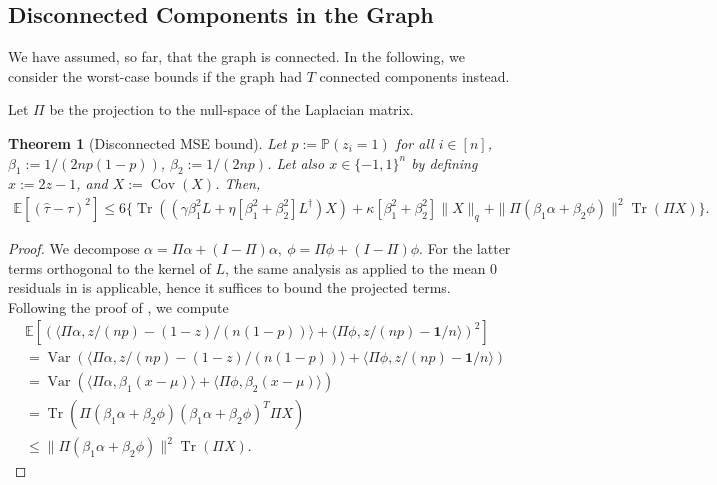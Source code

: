 \documentclass[12pt]{article}
\newtheorem{theorem}{Theorem}
\theoremstyle{definition}
\numberwithin{equation}{section}
\numberwithin{figure}{section}
\numberwithin{equation}{section}
\numberwithin{figure}{section}
\begin{document}
\subsection{Disconnected Components in the Graph}\label{sec:graph comps}
We have assumed, so far, that the graph is connected. In the following, we consider the worst-case bounds if the graph had $T$ connected components instead.

Let $\Pi$ be the projection to the null-space of the Laplacian matrix. 

\begin{theorem}[Disconnected MSE bound] \label{thm:mse_bound_general_projection}
Let $p:= \mathbb{P}(z_i = 1)$ for all $i \in [n]$, $\beta_1 := 1/(2np(1-p))$, $\beta_2 := 1/(2np)$. Let also $x \in \{-1, 1\}^n$ by defining $x := 2z-1$, and $X:= \operatorname{Cov}(X)$. Then, 
     \begin{align*}
          \mathbb{E}[(\hat{\tau} -\tau)^2] \leq 6 \{ \operatorname{Tr}((\gamma \beta_1^2 L + \eta[\beta_1^2 + \beta_2^2] L^\dagger) X) + \kappa[\beta_1^2 + \beta_2^2] \|X\|_{q} + \|\Pi(\beta_1 \alpha + \beta_2 \phi)\|^2 \operatorname{Tr}(\Pi X)\}.
     \end{align*}
\end{theorem}

\begin{proof}
    We decompose $\alpha = \Pi \alpha + (I - \Pi)\alpha,\ \phi = \Pi \phi + (I - \Pi) \phi$. For the latter terms orthogonal to the kernel of $L$, the same analysis as applied to the mean 0 residuals in  is applicable, hence it suffices to bound the projected terms.
    Following the proof of , we compute
    \begin{align*}
         &\mathbb{E}[(\langle \Pi \alpha, z/(np) - (1-z)/(n(1-p))  \rangle + \langle \Pi \phi, z/(np) - \mathbf{1}/n \rangle)^2] \\
         &= \operatorname{Var}(\langle \Pi \alpha, z/(np) - (1-z)/(n(1-p))\rangle + \langle \Pi \phi, z/(np) - \mathbf{1}/n \rangle )\\
         &= \operatorname{Var}(\langle \Pi\alpha, \beta_1 (x-\mu) \rangle + \langle \Pi \phi, \beta_2 (x-\mu) \rangle)\\
         &=\operatorname{Tr}(\Pi(\beta_1 \alpha + \beta_2 \phi)(\beta_1 \alpha + \beta_2 \phi)^T\Pi X)\\
         &\leq \|\Pi(\beta_1 \alpha + \beta_2 \phi)\|^2 \operatorname{Tr}(\Pi X).
     \end{align*}
\end{proof}
\end{document}

